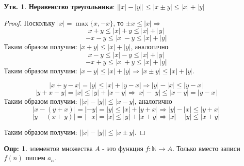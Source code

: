 \documentclass[12pt]{article}
\theoremstyle{definition}
\newtheorem{defn}{Опр:}
\newtheorem{prop}{Утв.}
\begin{document}
\begin{prop}\textbf{Неравенство треугольника}:
	$\big||x| - |y| \big| \leq |x \pm y| \leq |x| + |y|$
\end{prop}

\begin{proof}
	Поскольку $|x| = \max\{x, -x\}$, то $\pm x \leq |x| \Rightarrow$
	$$ x + y \leq |x| + y \leq |x| + |y|$$
	$$ -x - y \leq |x| - y \leq |x| + |y|$$
Таким образом получим: $|x + y| \leq |x| + |y|$, аналогично
	$$ x - y \leq |x| - y \leq |x| + |y|$$
	$$ -x + y \leq |x| + y \leq |x| + |y|$$
Таким образом получим: $|x - y| \leq |x| + |y| \Rightarrow |x \pm y| \leq |x| +|y|$.

$$ |x + y - x| = |y| \leq |x| + |y - x| \Rightarrow |y| - |x| \leq |y-x|$$
$$ |y + x - y| = |x| \leq |y| + |x - y| \Rightarrow |x| - |y| \leq |x-y| = |y-x|$$
Таким образом получим: $\big||x| - |y|\big| \leq |x - y|$, аналогично
$$ |x - (y + x)| = |-y| = |y| \leq |x| + |y + x| \Rightarrow |y| - |x| \leq |y + x|$$
$$ |y - (x + y)| = |-x| = |x| \leq |y| + |x + y| \Rightarrow |x| - |y| \leq |x + y|$$

Таким образом получим: $\big||x| - |y|\big| \leq |x \pm y|$.

\end{proof}

\begin{defn}
	 элементов множества $A$ - это функция $f \colon \mathbb{N} \rightarrow A$. Только вместо записи $f(n)$ пишем $a_n$.
\end{defn}
\end{document}

